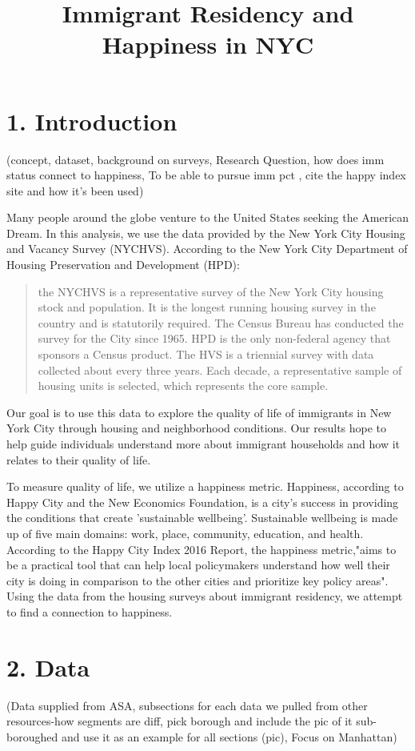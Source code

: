 \documentclass{article}\usepackage[]{graphicx}\usepackage[]{color}
\title{Immigrant Residency and Happiness in NYC}
\begin{document}
\maketitle

\section*{1. Introduction} (concept, dataset, background on surveys, Research Question, how does imm status connect to happiness, To be able to pursue imm pct , cite the happy index site and how it's been used)


Many people around the globe venture to the United States seeking the American Dream. In this analysis, we use the data provided by the New York City Housing and Vacancy Survey (NYCHVS). According to the New York City Department of Housing Preservation and Development (HPD): \begin{quote} the NYCHVS is a representative survey of the New York City housing stock and population. It is the longest running housing survey in the country and is statutorily required. The Census Bureau has conducted the survey for the City since 1965. HPD is the only non-federal agency that sponsors a Census product. The HVS is a triennial survey with data collected about every three years. Each decade, a representative sample of housing units is selected, which represents the core sample.\end{quote} 
Our goal is to use this data to explore the quality of life of immigrants in New York City through housing and neighborhood conditions. Our results hope to help guide individuals understand more about immigrant households and how it relates to their quality of life.

To measure quality of life, we utilize a happiness metric. Happiness, according to Happy City and the New Economics Foundation, is a city's success in providing the conditions that create 'sustainable wellbeing'. Sustainable wellbeing is made up of five main domains: work, place, community, education, and health. According to the Happy City Index 2016 Report, the happiness metric,"aims to be a practical tool that can help local policymakers understand how well their city is doing in comparison to the other cities and prioritize key policy areas". Using the data from the housing surveys about immigrant residency, we attempt to find a connection to happiness. 

\section*{2. Data} (Data supplied from ASA, subsections for each data we pulled from other resources-how segments are diff, pick borough and include the pic of it sub-boroughed and use it as an example for all sections (pic), Focus on Manhattan)
\end{document}
